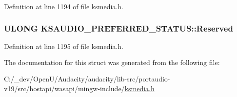 Definition at line 1194 of file ksmedia.\+h.

\subsubsection[{\texorpdfstring{Reserved}{Reserved}}]{\setlength{\rightskip}{0pt plus 5cm}U\+L\+O\+NG K\+S\+A\+U\+D\+I\+O\+\_\+\+P\+R\+E\+F\+E\+R\+R\+E\+D\+\_\+\+S\+T\+A\+T\+U\+S\+::\+Reserved}\hypertarget{struct_k_s_a_u_d_i_o___p_r_e_f_e_r_r_e_d___s_t_a_t_u_s_af2287d582962f1617285ddc6daaa0885}{}\label{struct_k_s_a_u_d_i_o___p_r_e_f_e_r_r_e_d___s_t_a_t_u_s_af2287d582962f1617285ddc6daaa0885}


Definition at line 1195 of file ksmedia.\+h.



The documentation for this struct was generated from the following file\+:\begin{DoxyCompactItemize}
\item 
C\+:/\+\_\+dev/\+Open\+U/\+Audacity/audacity/lib-\/src/portaudio-\/v19/src/hostapi/wasapi/mingw-\/include/\hyperlink{ksmedia_8h}{ksmedia.\+h}\end{DoxyCompactItemize}
